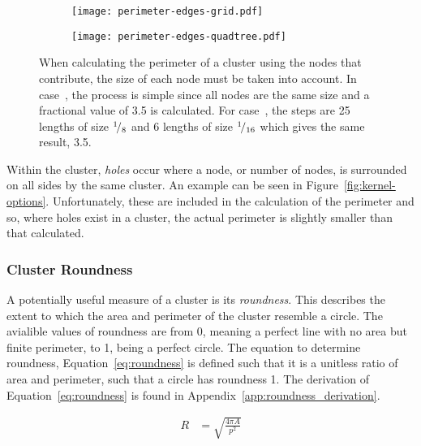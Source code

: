 \begin{figure}[tbhp]
	\centering
	\begin{subfigure}[c]{3.5cm}
		\texttt{[image: perimeter-edges-grid.pdf]}
		\caption{}\label{fig:perimeter-edges-grid.pdf}
	\end{subfigure}%
	\quad
	\begin{subfigure}[c]{3.5cm}
		\texttt{[image: perimeter-edges-quadtree.pdf]}
		\caption{}\label{fig:perimeter-edges-quadtree.pdf}
	\end{subfigure}

	\caption{When calculating the perimeter of a cluster using the nodes that
		contribute, the size of each node must be taken into account. In
		case~, the process is simple since
		all nodes are the same size and a fractional value of 3.5 is
		calculated. For case~, the
		steps are 25 lengths of size ${}^{1}\!/_{8}$ and 6 lengths of size
		${}^{1}\!/_{16}$ which gives the same result, 3.5.}\label{fig:perimeter-edges}

\end{figure}

Within the cluster, \emph{holes} occur where a node, or number of nodes, is
surrounded on all sides by the same cluster. An example can be seen in
Figure~\ref{fig:kernel-options}. Unfortunately, these are included in the
calculation of the perimeter and so, where holes exist in a cluster, the actual
perimeter is slightly smaller than that calculated.

\subsubsection{Cluster Roundness}
\label{ssub:Cluster_Roundness}

A potentially useful measure of a cluster is its \emph{roundness}. This
describes the extent to which the area and perimeter of the cluster resemble a
circle. The avialible values of roundness are from 0, meaning a perfect line
with no area but finite perimeter, to 1, being a perfect circle. The equation
to determine roundness, Equation~\ref{eq:roundness} is defined such that it is
a unitless ratio of area and perimeter, such that a circle has roundness 1. The
derivation of Equation~\ref{eq:roundness} is found in
Appendix~\ref{app:roundness_derivation}.

\begin{align}
	R &= \sqrt{\frac{4\pi A}{p^2}} \label{eq:roundness}
\end{align}

